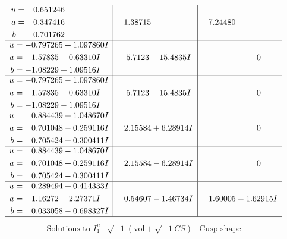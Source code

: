 \documentclass[1p]{elsarticle_modified}
\theoremstyle{definition}
\newcommand{\I}{\sqrt{-1}}
\begin{document}
$$\begin{array}{c|c|c}
\begin{aligned}
u &= \phantom{-}0.651246\phantom{ +0.000000I} \\
a &= \phantom{-}0.347416\phantom{ +0.000000I} \\
b &= \phantom{-}0.701762\phantom{ +0.000000I}\end{aligned}
 & \phantom{-}1.38715\phantom{ +0.000000I} & \phantom{-}7.24480\phantom{ +0.000000I} \\ \hline\begin{aligned}
u &= -0.797265 + 1.097860 I \\
a &= -1.57835 - 0.63310 I \\
b &= -1.08229 + 1.09516 I\end{aligned}
 & \phantom{-}5.7123 - 15.4835 I & \phantom{-0.000000 } 0 \\ \hline\begin{aligned}
u &= -0.797265 - 1.097860 I \\
a &= -1.57835 + 0.63310 I \\
b &= -1.08229 - 1.09516 I\end{aligned}
 & \phantom{-}5.7123 + 15.4835 I & \phantom{-0.000000 } 0 \\ \hline\begin{aligned}
u &= \phantom{-}0.884439 + 1.048670 I \\
a &= \phantom{-}0.701048 - 0.259116 I \\
b &= \phantom{-}0.705424 + 0.300411 I\end{aligned}
 & \phantom{-}2.15584 + 6.28914 I & \phantom{-0.000000 } 0 \\ \hline\begin{aligned}
u &= \phantom{-}0.884439 - 1.048670 I \\
a &= \phantom{-}0.701048 + 0.259116 I \\
b &= \phantom{-}0.705424 - 0.300411 I\end{aligned}
 & \phantom{-}2.15584 - 6.28914 I & \phantom{-0.000000 } 0 \\ \hline\begin{aligned}
u &= \phantom{-}0.289494 + 0.414333 I \\
a &= \phantom{-}1.16272 + 2.27371 I \\
b &= \phantom{-}0.033058 - 0.698327 I\end{aligned}
 & \phantom{-}0.54607 - 1.46734 I & \phantom{-}1.60005 + 1.62915 I\\
 \hline 
 \end{array}$$\newpage$$\begin{array}{c|c|c}  
\text{Solutions to }I^u_{1}& \I (\text{vol} + \sqrt{-1}CS) & \text{Cusp shape}\\

\end{array}$$
\end{document}
